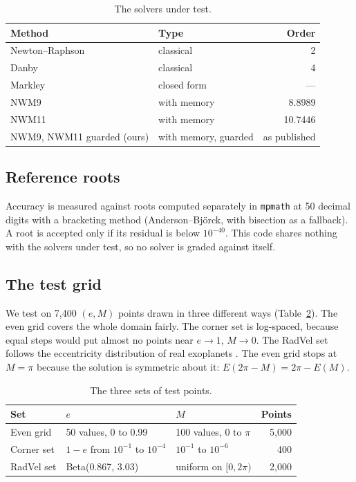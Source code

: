 \documentclass[sigconf,nonacm]{acmart}
\begin{document}
\begin{table}[h]
\centering\small
\caption{The solvers under test.}
\label{tab:solvers}
\begin{tabular}{@{}llr@{}}
\toprule
\textbf{Method} & \textbf{Type} & \textbf{Order} \\
\midrule
Newton--Raphson                & classical            & 2 \\
Danby \cite{danby}             & classical            & 4 \\
Markley \cite{markley}         & closed form          & --- \\
NWM9 \cite{nwm9}               & with memory          & 8.8989 \\
NWM11 \cite{nwm11}             & with memory          & 10.7446 \\
NWM9, NWM11 guarded (ours)     & with memory, guarded & as published \\
\bottomrule
\end{tabular}
\end{table}

\subsection{Reference roots}

Accuracy is measured against roots computed separately in \texttt{mpmath}
at 50 decimal digits with a bracketing method (Anderson--Bj\"orck, with
bisection as a fallback). A root is accepted only if its residual is below
$10^{-40}$. This code shares nothing
with the solvers under test, so no solver is graded against itself.

\subsection{The test grid}
\label{sec:gridsetup}

We test on 7{,}400 $(e, M)$ points drawn in three different ways
(Table~\ref{tab:grid-sets}). The even grid covers the whole domain fairly.
The corner set is log-spaced, because equal steps would put almost no
points near $e \to 1$, $M \to 0$. The RadVel set follows the eccentricity
distribution of real exoplanets \cite{kipping}. The even grid stops at
$M = \pi$ because the solution is symmetric about it:
$E(2\pi - M) = 2\pi - E(M)$.

\begin{table}[h]
\centering\small
\caption{The three sets of test points.}
\label{tab:grid-sets}
\begin{tabular}{@{}lllr@{}}
\toprule
\textbf{Set} & \textbf{$e$} & \textbf{$M$} & \textbf{Points} \\
\midrule
Even grid  & 50 values, 0 to 0.99         & 100 values, 0 to $\pi$        & 5{,}000 \\
Corner set & $1-e$ from $10^{-1}$ to $10^{-4}$ & $10^{-1}$ to $10^{-6}$ & 400 \\
RadVel set & Beta(0.867, 3.03)            & uniform on $[0, 2\pi)$         & 2{,}000 \\
\bottomrule
\end{tabular}
\end{table}
\end{document}
